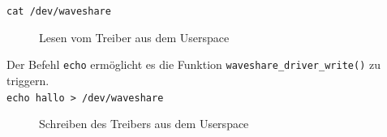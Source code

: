 \texttt{cat /dev/waveshare} \\

\begin{figure}[H]
  \centering
  \caption{Lesen vom Treiber aus dem Userspace}
  \label{pic:cat_read}
\end{figure}

Der Befehl \texttt{echo} ermöglicht es die Funktion \texttt{waveshare_driver_write()} zu triggern. \\

\texttt{echo hallo > /dev/waveshare} \\

\begin{figure}[H]
  \centering
  \caption{Schreiben des Treibers aus dem Userspace}
  \label{pic:echo_write}
\end{figure}

